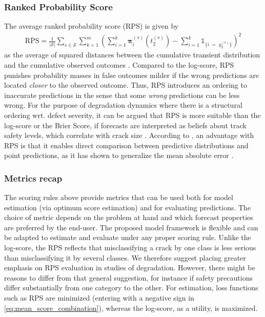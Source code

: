 \subsubsection{Ranked Probability Score}
The average ranked probability score (RPS) is given by
\begin{align}
    \overline{\text{RPS}} =\frac{1}{\vert \mathcal{S} \vert} \sum_{s \in \mathcal{S}} \sum_{k = 1}^m\left( \sum_{i = 1}^k\bm{\pi}^{(s)}_i\left( t_2^{(s)} \right)  - \sum_{i = 1}^k\mathds{1}_{ \{ i \; = \; y_2^{(s)} \} } \right)^2 \label{eq:RPS}
\end{align}
as the average of squared distances between the cumulative transient distribution and the cumulative observed outcomes \citep{Epstein1969}.
Compared to the log-score, RPS punishes probability masses in false outcomes milder if the wrong predictions are located \textit{closer} to the observed outcome. Thus, RPS introduces an ordering to inaccurate predictions in the sense that some \textit{wrong} predictions can be less wrong.
For the purpose of degradation dynamics where there is a structural ordering wrt. defect severity, it can be argued that RPS is more suitable than the log-score or the Brier Score, if forecasts are interpreted as beliefs about track 
safety levels, which correlate with crack size \citep{UIC_2002_defecthandbook}. 
According to \citet{Czado2009}, an advantage with RPS is that it enables direct comparison between predictive distributions and point predictions, as it has shown to generalize the mean absolute error \citep{Hersbach2000}.



\subsubsection{Metrics recap} \label{sec:metrics_recap}
The scoring rules above provide metrics that can be used both for model estimation (via optimum score estimation) and for evaluating predictions. The choice of metric depends on the problem at hand and which forecast properties are preferred by the end-user. 
The proposed model framework is flexible and can be adapted to estimate and evaluate under any proper scoring rule.
Unlike the log-score, the RPS reflects that misclassifying a crack by one class is less serious than misclassifying it by several classes. We therefore suggest placing greater emphasis on RPS evaluation in studies of degradation. 
However, there might be reasons to differ from that general suggestion, for instance if safety precautions differ substantially from one category to the other.
For estimation, loss functions such as RPS are minimized (entering with a negative sign in \cref{eq:mean_score_combination}), whereas the log-score, as a utility, is maximized.


